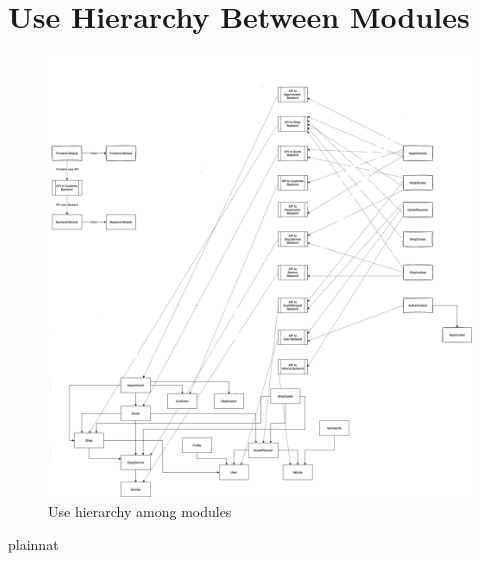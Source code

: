 \documentclass[12pt, titlepage]{article}
\begin{document}
\section{Use Hierarchy Between Modules} \label{SecUse}


\begin{figure}[H]
\centering
\includegraphics[width=1\textwidth]{use_heirarchy.png}
\caption{Use hierarchy among modules}
\label{FigUH}
\end{figure}


 {plainnat}


\newpage{}
\end{document}
